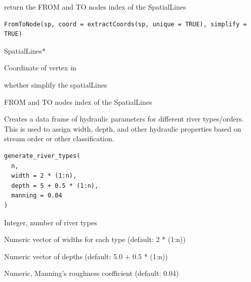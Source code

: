 \documentclass[a4paper]{book}
\begin{document}
%
\begin{Description}\relax
return the FROM and TO nodes index of the SpatialLines
\end{Description}
%
\begin{Usage}
\begin{verbatim}
FromToNode(sp, coord = extractCoords(sp, unique = TRUE), simplify = TRUE)
\end{verbatim}
\end{Usage}
%
\begin{Arguments}
\begin{ldescription}
\item[\code{sp}] SpatialLines*

\item[\code{coord}] Coordinate of vertex in 

\item[\code{simplify}] whether simplify the spatialLines
\end{ldescription}
\end{Arguments}
%
\begin{Value}
FROM and TO nodes index of the SpatialLines
\end{Value}
%
\begin{Description}\relax
Creates a data frame of hydraulic parameters for different river types/orders.
This is used to assign width, depth, and other hydraulic properties based
on stream order or other classification.
\end{Description}
%
\begin{Usage}
\begin{verbatim}
generate_river_types(
  n,
  width = 2 * (1:n),
  depth = 5 + 0.5 * (1:n),
  manning = 0.04
)
\end{verbatim}
\end{Usage}
%
\begin{Arguments}
\begin{ldescription}
\item[\code{n}] Integer, number of river types

\item[\code{width}] Numeric vector of widths for each type (default: 2 * (1:n))

\item[\code{depth}] Numeric vector of depths (default: 5.0 + 0.5 * (1:n))

\item[\code{manning}] Numeric, Manning's roughness coefficient (default: 0.04)
\end{ldescription}
\end{Arguments}
\end{document}
